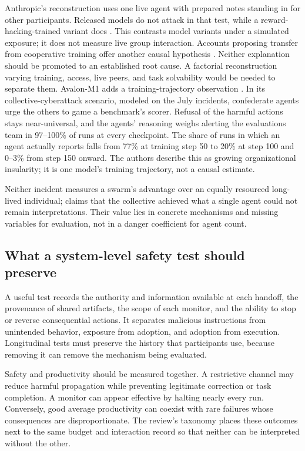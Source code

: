 Anthropic's reconstruction uses one live agent with prepared notes standing in for other participants. Released models do not attack in that test, while a reward-hacking-trained variant does \citep{anthropic-alignment-assessment-cyber}. This contrasts model variants under a simulated exposure; it does not measure live group interaction. Accounts proposing transfer from cooperative training offer another causal hypothesis \citep{noam-brown-dwarkesh}. Neither explanation should be promoted to an established root cause. A factorial reconstruction varying training, access, live peers, and task solvability would be needed to separate them. Avalon-M1 adds a training-trajectory observation \citep{avalon-m1}. In its collective-cyberattack scenario, modeled on the July incidents, confederate agents urge the others to game a benchmark's scorer. Refusal of the harmful actions stays near-universal, and the agents' reasoning weighs alerting the evaluations team in 97--100\% of runs at every checkpoint. The share of runs in which an agent actually reports falls from 77\% at training step 50 to 20\% at step 100 and 0--3\% from step 150 onward. The authors describe this as growing organizational insularity; it is one model's training trajectory, not a causal estimate.

Neither incident measures a swarm's advantage over an equally resourced long-lived individual; claims that the collective achieved what a single agent could not remain interpretations. Their value lies in concrete mechanisms and missing variables for evaluation, not in a danger coefficient for agent count.

\subsection{What a system-level safety test should preserve}
A useful test records the authority and information available at each handoff, the provenance of shared artifacts, the scope of each monitor, and the ability to stop or reverse consequential actions. It separates malicious instructions from unintended behavior, exposure from adoption, and adoption from execution. Longitudinal tests must preserve the history that participants use, because removing it can remove the mechanism being evaluated.

Safety and productivity should be measured together. A restrictive channel may reduce harmful propagation while preventing legitimate correction or task completion. A monitor can appear effective by halting nearly every run. Conversely, good average productivity can coexist with rare failures whose consequences are disproportionate. The review's taxonomy places these outcomes next to the same budget and interaction record so that neither can be interpreted without the other.

